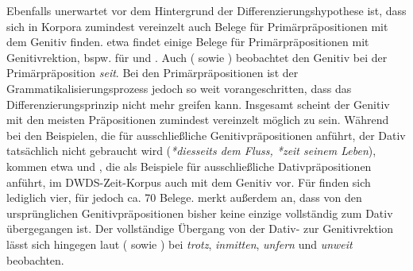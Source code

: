 Ebenfalls unerwartet vor dem Hintergrund der Differenzierungshypothese ist, dass sich in Korpora zumindest vereinzelt auch Belege für Primärpräpositionen mit dem Genitiv finden. 
\citet[259--260]{DiMeola2005b} etwa findet einige Belege für Primärpräpositionen mit Genitivrektion, bspw. für  und  \citep[s. auch][211]{DiMeola2009}. 
Auch \citeauthor{Vater.2009} (\citeyear[58]{Vater.2009} sowie \citeyear[220]{Vater.2015}) beobachtet den Genitiv bei der Prim{\"a}rpr{\"a}position \textit{seit}. 
Bei den Primärpräpositionen ist der Grammatikalisierungsprozess jedoch so weit vorangeschritten, dass das Differenzierungsprinzip nicht mehr greifen kann. 
Insgesamt scheint der Genitiv mit den meisten Präpositionen zumindest vereinzelt möglich zu sein. 
W{\"a}hrend bei den Beispielen, die \citeauthor{DiMeola2001} f{\"u}r ausschlie{\ss}liche Genitivpr{\"a}positionen anf{\"u}hrt, der Dativ tats{\"a}chlich nicht gebraucht wird (\textit{*diesseits dem Fluss, *zeit seinem Leben}), kommen etwa  und , die \citet[75--76]{DiMeola2001} als Beispiele f{\"u}r ausschlie{\ss}liche Dativpr{\"a}positionen anführt, im DWDS-Zeit-Korpus auch mit dem Genitiv vor. 
Für  finden sich lediglich vier, für  jedoch ca. 70 Belege.
\citet[255]{DiMeola2005b} merkt außerdem an, dass von den urspr{\"u}nglichen Genitivpr{\"a}positionen bisher keine einzige vollst{\"a}ndig zum Dativ {\"u}bergegangen ist.
Der vollst{\"a}ndige {\"U}bergang von der Dativ- zur Genitivrektion l{\"a}sst sich hingegen laut \citeauthor{DiMeola2005b} (\citeyear[170]{DiMeola2004} sowie \citeyear[256]{DiMeola2005b}) bei \textit{trotz}, \textit{inmitten}, \textit{unfern }und \textit{unweit }beobachten. 

